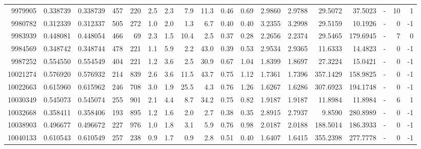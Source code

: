 \begin{tabular}{rrrrrrrrrrrrrrrlrr}
   9979905 & 0.338739 &   0.338739 &  457 &  220 &      2.5 &      2.3 &     7.9 &     11.3 &       0.46 &        0.69 &  2.9860 &  2.9788 &   29.5072 &   37.5023 &             - &       10 &          1 \\
   9980782 & 0.312339 &   0.312337 &  505 &  272 &      1.0 &      2.0 &     1.3 &      6.7 &       0.40 &        0.40 &  3.2355 &  3.2998 &   29.5159 &   10.1926 &             - &        0 &         -1 \\
   9983939 & 0.448081 &   0.448054 &  466 &   69 &      2.3 &      1.5 &    10.4 &      2.5 &       0.37 &        0.28 &  2.2656 &  2.2374 &   29.5465 &  179.6945 &             - &        7 &          0 \\
   9984569 & 0.348742 &   0.348744 &  478 &  221 &      1.1 &      5.9 &     2.2 &     43.0 &       0.39 &        0.53 &  2.9534 &  2.9365 &   11.6333 &   14.4823 &             - &        0 &         -1 \\
   9987252 & 0.554550 &   0.554549 &  404 &  221 &      1.2 &      3.6 &     2.5 &     30.9 &       0.67 &        1.04 &  1.8399 &  1.8697 &   27.3224 &   15.0421 &             - &        0 &         -1 \\
  10021274 & 0.576920 &   0.576932 &  214 &  839 &      2.6 &      3.6 &    11.5 &     43.7 &       0.75 &        1.12 &  1.7361 &  1.7396 &  357.1429 &  158.9825 &             - &        0 &         -1 \\
  10022663 & 0.615960 &   0.615962 &  246 &  708 &      3.0 &      1.9 &    25.5 &      4.3 &       0.76 &        1.26 &  1.6267 &  1.6286 &  307.6923 &  194.1748 &             - &        0 &         -1 \\
  10030349 & 0.545073 &   0.545074 &  255 &  901 &      2.1 &      4.4 &     8.7 &     34.2 &       0.75 &        0.82 &  1.9187 &  1.9187 &   11.8984 &   11.8984 &             - &        6 &          1 \\
  10032668 & 0.358411 &   0.358406 &  193 &  895 &      1.2 &      1.6 &     2.0 &      2.7 &       0.38 &        0.35 &  2.8915 &  2.7937 &    9.8590 &  280.8989 &             - &        0 &         -1 \\
  10038903 & 0.496677 &   0.496672 &  227 &  976 &      1.0 &      1.8 &     3.1 &      5.9 &       0.76 &        0.98 &  2.0187 &  2.0188 &  188.5014 &  186.3933 &             - &        0 &         -1 \\
  10040133 & 0.610543 &   0.610549 &  257 &  238 &      0.9 &      1.7 &     0.9 &      2.8 &       0.51 &        0.40 &  1.6407 &  1.6415 &  355.2398 &  277.7778 &             - &        0 &         -1 \\

\end{tabular}
